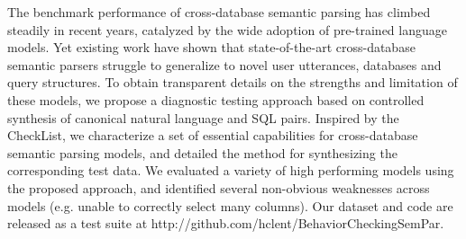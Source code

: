 The benchmark performance of cross-database semantic parsing has climbed steadily in recent years, catalyzed by the wide adoption of pre-trained language models. Yet existing work have shown that state-of-the-art cross-database semantic parsers struggle to generalize to novel user utterances, databases and query structures.  To obtain transparent details on the strengths and limitation of these models, we propose a diagnostic testing approach based on controlled synthesis of canonical natural language and SQL pairs. Inspired by the CheckList, we characterize a set of essential capabilities for cross-database semantic parsing models, and detailed the method for synthesizing the corresponding test data. We evaluated a variety of high performing models using the proposed approach, and identified several non-obvious weaknesses across models (e.g. unable to correctly select many columns). Our dataset and code are released as a test suite at http://github.com/hclent/BehaviorCheckingSemPar.
